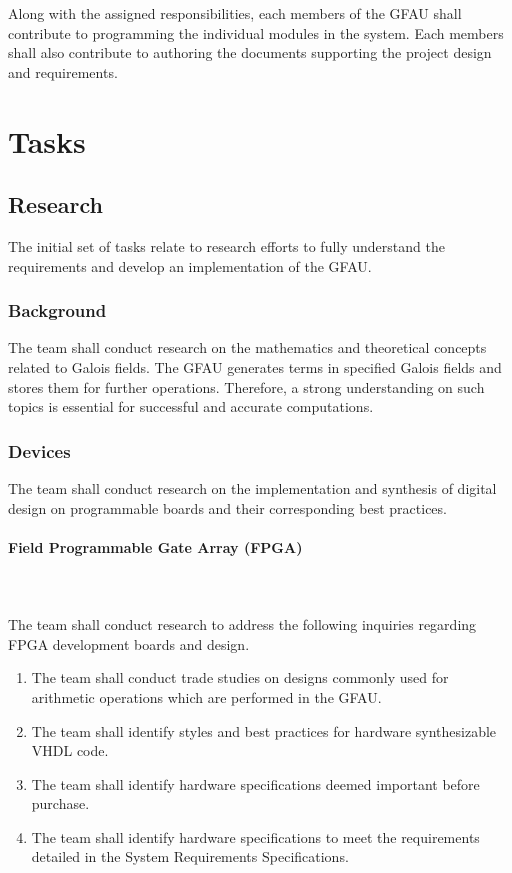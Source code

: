 \documentclass[12pt]{extarticle}
\begin{document}
    Along with the assigned responsibilities, each members of the GFAU shall
    contribute to programming the individual modules in the system. Each
    members shall also contribute to authoring the documents supporting the
    project design and requirements.

    \section{Tasks}

        \subsection{Research} The initial set of tasks relate to research
        efforts to fully understand the requirements and develop an
        implementation of the GFAU.

            \subsubsection{Background} The team shall conduct research on the
            mathematics and theoretical concepts related to Galois fields. The
            GFAU generates terms in specified Galois fields and stores them for
            further operations. Therefore, a strong understanding on such
            topics is essential for successful and accurate computations.

            \subsubsection{Devices} The team shall conduct research on the
            implementation and synthesis of digital design on programmable
            boards and their corresponding best practices.
            
                \paragraph{Field Programmable Gate Array (FPGA)} \leavevmode
                \\~\\ The team shall conduct research to address the following
                inquiries regarding FPGA development boards and design.
                \begin{enumerate}
                    \item The team shall conduct trade studies on designs
                    commonly used for arithmetic operations which are performed
                    in the GFAU.
                    \item The team shall identify styles and best practices for
                    hardware synthesizable VHDL code.
                    \item The team shall identify hardware specifications
                    deemed important before purchase.
                    \item The team shall identify hardware specifications to
                    meet the requirements detailed in the System Requirements
                    Specifications.
                \end{enumerate}
\end{document}
